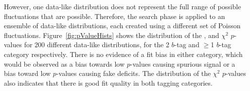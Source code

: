 However, one data-like distribution does not represent the full range of possible fluctuations that are possible.
Therefore, the search phase is applied to an ensemble of data-like distributions,
each created using a different set of Poisson fluctuations.
Figure~\ref{fig:pValueHists}  shows the distribution of
the \bh{}, \dhunt{} and $\chi^{2}$ \mbox{$p$-value}s for 200 different data-like distributions,
for the 2 $b$-tag and $\geq$1 $b$-tag category respectively.
There is no evidence of a fit bias in either category,
which would be observed as a bias towards low \bh{} \mbox{$p$-value}s causing spurious signal
or a bias toward low \dhunt{} \mbox{$p$-value}s causing fake deficits.
The distribution of the $\chi^{2}$ \mbox{$p$-value}s also indicates that there is good fit quality in both tagging categories.



